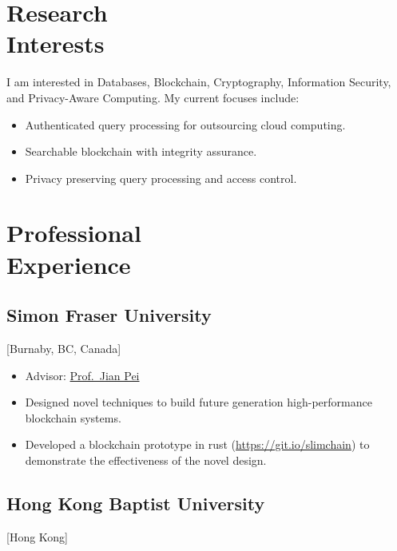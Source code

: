 \documentclass{mycv}
\begin{document}
\maketitle%

\section{Research \\ Interests}

I am interested in Databases, Blockchain, Cryptography, Information Security, and Privacy-Aware Computing. My current focuses include:

\begin{itemize}
  \item Authenticated query processing for outsourcing cloud computing.
  \item Searchable blockchain with integrity assurance.
  \item Privacy preserving query processing and access control.
\end{itemize}

\section{Professional \\ Experience}

\subsection{Simon Fraser University}[Burnaby, BC, Canada]
\begin{positions}
\end{positions}

\begin{itemize}
  \item Advisor: \href{https://www.cs.sfu.ca/~jpei/}{Prof.~Jian Pei}
  \item Designed novel techniques to build future generation high-performance blockchain systems.
  \item Developed a blockchain prototype in rust (\url{https://git.io/slimchain}) to demonstrate the effectiveness of the novel design.
\end{itemize}

\subsection{Hong Kong Baptist University}[Hong Kong]
\begin{positions}
\end{positions}
\end{document}
